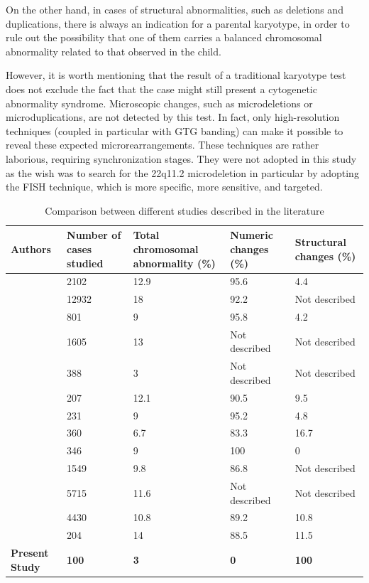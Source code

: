 \begin{refsection}
On the other hand, in cases of structural abnormalities, such as deletions and duplications, there is always an indication for a parental karyotype, in order to rule out the possibility that one of them carries a balanced chromosomal abnormality related to that observed in the child. 

However, it is worth mentioning that the result of a traditional karyotype test does not exclude the fact that the case might still present a cytogenetic abnormality syndrome. Microscopic changes, such as microdeletions or microduplications, are not detected by this test. In fact, only high-resolution techniques (coupled in particular with GTG banding) can make it possible to reveal these expected microrearrangements. These techniques are rather laborious, requiring synchronization stages. They were not adopted in this study as the wish was to search for the 22q11.2 microdeletion in particular by adopting the FISH technique, which is more specific, more sensitive, and targeted.

\begin{landscape}
\begin{table}[!p]
\centering
\caption{Comparison between different studies described in the literature}
\label{tab:3.2litreview}
\begin{tabular}{  P{1in} P{1in} P{2in} P{2in} P{2in}  }
\hline
	Authors & Number of cases studied & Total chromosomal abnormality (\%) & Numeric changes (\%) & Structural changes (\%) \\ \hline
	\cite{ferencz1989congenital} & 2102 & 12.9 & 95.6 & 4.4 \\ \hline
	\cite{harris2003epidemiology} & 12932 & 18 & 92.2 & Not described \\ \hline
	\cite{stoll1989risk} & 801 & 9 & 95.8 & 4.2 \\ \hline
	\cite{pradat1992epidemiology} & 1605 & 13 & Not described & Not described \\ \hline
	\cite{hanna1994genetic} & 388 & 3 & Not described & Not described \\ \hline
	\cite{goodship1998population} & 207 & 12.1 & 90.5 & 9.5 \\ \hline
	\cite{grech1999syndromes} & 231 & 9 & 95.2 & 4.8 \\ \hline
	\cite{meberg2000outcome} & 360 & 6.7 & 83.3 & 16.7 \\ \hline
	\cite{roodpeyma2002risk} & 346 & 9 & 100 & 0 \\ \hline
	\cite{calzolari2003congenital} & 1549 & 9.8 & 86.8 & Not described \\ \hline
	\cite{dadvand2009descriptive} & 5715 & 11.6 & Not described & Not described \\ \hline
	\cite{hartman2011contribution} & 4430 & 10.8 & 89.2 & 10.8 \\ \hline
	\cite{rosa2011trisomy} & 204 & 14 & 88.5 & 11.5 \\ \hline
	\textbf{Present Study} & \textbf{100} & \textbf{3} & \textbf{0} & \textbf{100} \\ \hline
\end{tabular}
\end{table}
\end{landscape}



\end{refsection}
